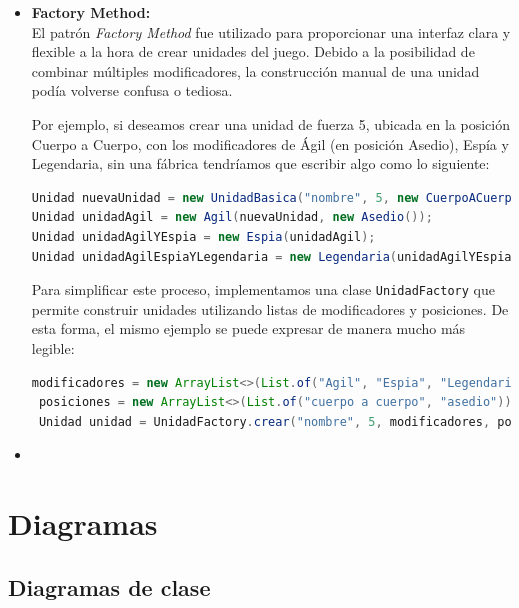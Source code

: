 \documentclass[titlepage,a4paper]{article}
\begin{document}
\begin{itemize}
		\item \textbf{Factory Method:} \\
		El patrón \textit{Factory Method} fue utilizado para proporcionar una interfaz clara y flexible a la hora de crear unidades del juego. Debido a la posibilidad de combinar múltiples modificadores, la construcción manual de una unidad podía volverse confusa o tediosa.

		Por ejemplo, si deseamos crear una unidad de fuerza 5, ubicada en la posición Cuerpo a Cuerpo, con los modificadores de Ágil (en posición Asedio), Espía y Legendaria, sin una fábrica tendríamos que escribir algo como lo siguiente:

		\begin{lstlisting}[language=Java, caption={Ejemplo de creación de unidad sin usar UnidadFactory}]
Unidad nuevaUnidad = new UnidadBasica("nombre", 5, new CuerpoACuerpo());
Unidad unidadAgil = new Agil(nuevaUnidad, new Asedio());
Unidad unidadAgilYEspia = new Espia(unidadAgil);
Unidad unidadAgilEspiaYLegendaria = new Legendaria(unidadAgilYEspia);
		\end{lstlisting}

		Para simplificar este proceso, implementamos una clase \texttt{UnidadFactory} que permite construir unidades utilizando listas de modificadores y posiciones. De esta forma, el mismo ejemplo se puede expresar de manera mucho más legible:

		\begin{lstlisting}[language=Java, caption={Ejemplo de creación de unidad usando UnidadFactory}]
 modificadores = new ArrayList<>(List.of("Agil", "Espia", "Legendaria"));
 posiciones = new ArrayList<>(List.of("cuerpo a cuerpo", "asedio"));
 Unidad unidad = UnidadFactory.crear("nombre", 5, modificadores, posiciones);
		\end{lstlisting}

	\item \end{itemize}


	\section{Diagramas}\label{sec:diagramas}


	\subsection{Diagramas de clase}\label{sec:diagramasdeclase}
\end{document}
